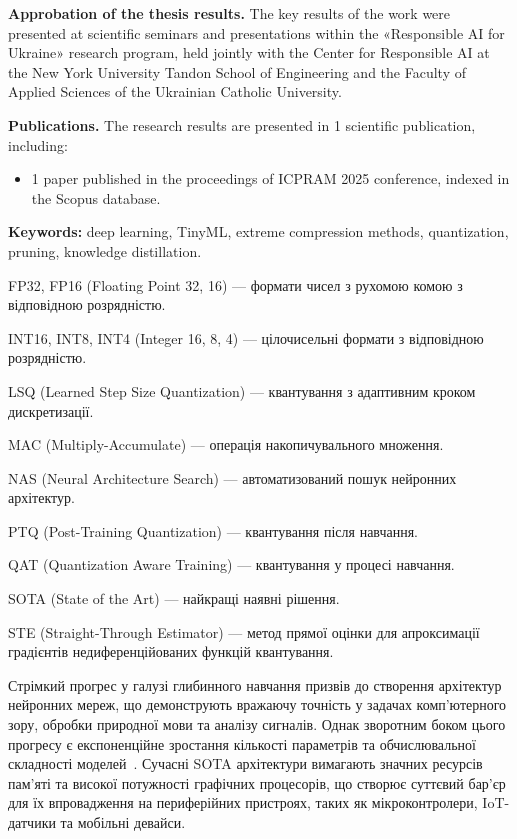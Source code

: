 \documentclass{pma-mthesis}
\begin{document}
\textbf{Approbation of the thesis results.} The key results of the work were presented at scientific seminars and presentations within the «Responsible AI for Ukraine» research program, held jointly with the Center for Responsible AI at the New York University Tandon School of Engineering and the Faculty of Applied Sciences of the Ukrainian Catholic University.

\textbf{Publications.} The research results are presented in 1 scientific publication, including:
\begin{itemize}[label=--, partopsep=0pt, parsep=0pt, topsep=0pt, itemsep=0pt, itemindent=1.7cm, leftmargin=0pt]
    \item 1 paper published in the proceedings of ICPRAM 2025 conference, indexed in the Scopus database.
\end{itemize}

\textbf{Keywords:} deep learning, TinyML, extreme compression methods, quantization, pruning, knowledge distillation.

\clearpage

\pagestyle{plain}

\tableofcontents

\shortings

FP32, FP16 (Floating Point 32, 16) --- формати чисел з рухомою комою з відповідною розрядністю.  

INT16, INT8, INT4 (Integer 16, 8, 4) --- цілочисельні формати з відповідною розрядністю.  

LSQ (Learned Step Size Quantization) --- квантування з адаптивним кроком дискретизації.  

MAC (Multiply-Accumulate) --- операція накопичувального множення.  

NAS (Neural Architecture Search) --- автоматизований пошук нейронних архітектур.  

PTQ (Post-Training Quantization) --- квантування після навчання.  

QAT (Quantization Aware Training) --- квантування у процесі навчання.  

SOTA (State of the Art) --- найкращі наявні рішення.  

STE (Straight-Through Estimator) --- метод прямої оцінки для апроксимації градієнтів недиференційованих функцій квантування.


\intro
Стрімкий прогрес у галузі глибинного навчання призвів до створення архітектур нейронних мереж, що демонструють вражаючу точність у задачах комп'ютерного зору, обробки природної мови та аналізу сигналів. Однак зворотним боком цього прогресу є експоненційне зростання кількості параметрів та обчислювальної складності моделей~\cite{openai2018compute}. Сучасні SOTA архітектури вимагають значних ресурсів пам'яті та високої потужності графічних процесорів, що створює суттєвий бар'єр для їх впровадження на периферійних пристроях, таких як мікроконтролери, IoT-датчики та мобільні девайси.~\cite{dehghani2022efficiency} 
\end{document}
